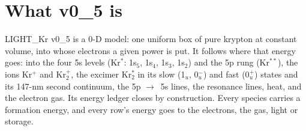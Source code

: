 \documentclass[11pt]{article}
\newcommand{\Krs}{Kr\ensuremath{^*}}
\newcommand{\Krpp}{Kr\ensuremath{^{**}}}
\newcommand{\Krp}{Kr\ensuremath{^+}}
\newcommand{\Krtp}{Kr\ensuremath{_2^+}}
\newcommand{\Krts}{Kr\ensuremath{_2^*}}
\newcommand{\lv}[1]{1s\ensuremath{_#1}}
\newcommand{\ra}{\ensuremath{\to}\ }
\begin{document}
\section{What v0\_5 is}
\label{sec:what}

LIGHT\_Kr v0\_5 is a 0-D model: one uniform box of pure krypton at
constant volume, into whose electrons a given power is put. It follows
where that energy goes: into the four 5s levels (\Krs: \lv{5}, \lv{4},
\lv{3}, \lv{2}) and the 5p rung (\Krpp), the ions \Krp{} and \Krtp, the
excimer \Krts{} in its slow (1$_u$, 0$_u^-$) and fast (0$_u^+$) states
and its 147-nm second continuum, the 5p \ra 5s lines, the resonance
lines, heat, and the electron gas. Its energy ledger closes by
construction. Every species carries a formation energy, and every row's
energy goes to the electrons, the gas, light or storage.
\end{document}
